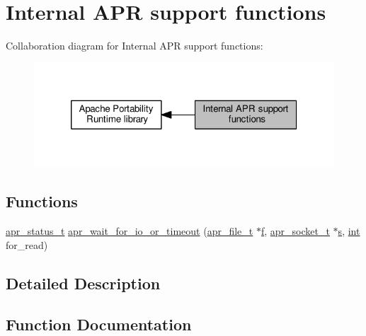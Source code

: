 \hypertarget{group__apr__support}{}\section{Internal A\+PR support functions}
\label{group__apr__support}
Collaboration diagram for Internal A\+PR support functions\+:
\nopagebreak
\begin{figure}[H]
\begin{center}
\leavevmode
\includegraphics[width=320pt]{group__apr__support}
\end{center}
\end{figure}
\subsection*{Functions}
\begin{DoxyCompactItemize}
\item 
\hyperlink{group__apr__errno_gaa5105fa83cc322f09382292db8b47593}{apr\+\_\+status\+\_\+t} \hyperlink{group__apr__support_ga324ffc66a6d42df2325ce999001c1c36}{apr\+\_\+wait\+\_\+for\+\_\+io\+\_\+or\+\_\+timeout} (\hyperlink{structapr__file__t}{apr\+\_\+file\+\_\+t} $\ast$\hyperlink{pcregrep_8txt_a588c778c1c1509e472f22dc36efb005e}{f}, \hyperlink{structapr__socket__t}{apr\+\_\+socket\+\_\+t} $\ast$\hyperlink{pcretest_8txt_a062597889ba244b72877454b1d3adecf}{s}, \hyperlink{pcre_8txt_a42dfa4ff673c82d8efe7144098fbc198}{int} for\+\_\+read)
\end{DoxyCompactItemize}


\subsection{Detailed Description}


\subsection{Function Documentation}
